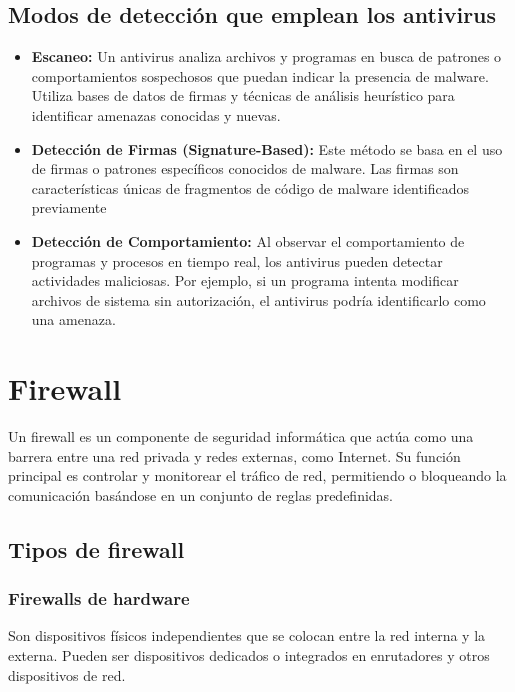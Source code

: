 \subsection{Modos de detección que emplean los antivirus}
 \begin{tcolorbox}[title= Modos de detección que emplean los antivirus]
 	\begin{itemize}
 		
 		
 		\item \textbf{Escaneo:}
 		Un antivirus analiza archivos y programas en busca de patrones o comportamientos sospechosos que puedan indicar la presencia de malware. Utiliza bases de datos de firmas y técnicas de análisis heurístico para identificar amenazas conocidas y nuevas.
 		\item \textbf{Detección de Firmas (Signature-Based):}
 		 Este método se basa en el uso de firmas o patrones específicos conocidos de malware. Las firmas son características únicas de fragmentos de código de malware identificados previamente
 		\item \textbf{Detección de Comportamiento:}
 		Al observar el comportamiento de programas y procesos en tiempo real, los antivirus pueden detectar actividades maliciosas. Por ejemplo, si un programa intenta modificar archivos de sistema sin autorización, el antivirus podría identificarlo como una amenaza.
 		 
 		
 	\end{itemize}
 \end{tcolorbox}
 \section{Firewall}
 Un firewall es un componente de seguridad informática que actúa como una barrera entre una red privada y redes externas, como Internet. Su función principal es controlar y monitorear el tráfico de red, permitiendo o bloqueando la comunicación basándose en un conjunto de reglas predefinidas.
 \subsection{Tipos de firewall}
 \subsubsection{Firewalls de hardware}
  Son dispositivos físicos independientes que se colocan entre la red interna y la externa. Pueden ser dispositivos dedicados o integrados en enrutadores y otros dispositivos de red.
 
